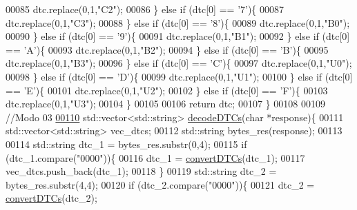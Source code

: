 \begin{DoxyCode}
00085         dtc.replace(0,1,\textcolor{stringliteral}{"C2"});
00086     \} \textcolor{keywordflow}{else} \textcolor{keywordflow}{if} (dtc[0] == \textcolor{charliteral}{'7'})\{
00087         dtc.replace(0,1,\textcolor{stringliteral}{"C3"});
00088     \} \textcolor{keywordflow}{else} \textcolor{keywordflow}{if} (dtc[0] == \textcolor{charliteral}{'8'})\{
00089         dtc.replace(0,1,\textcolor{stringliteral}{"B0"});
00090     \} \textcolor{keywordflow}{else} \textcolor{keywordflow}{if} (dtc[0] == \textcolor{charliteral}{'9'})\{
00091         dtc.replace(0,1,\textcolor{stringliteral}{"B1"});
00092     \} \textcolor{keywordflow}{else} \textcolor{keywordflow}{if} (dtc[0] == \textcolor{charliteral}{'A'})\{
00093         dtc.replace(0,1,\textcolor{stringliteral}{"B2"});
00094     \} \textcolor{keywordflow}{else} \textcolor{keywordflow}{if} (dtc[0] == \textcolor{charliteral}{'B'})\{
00095         dtc.replace(0,1,\textcolor{stringliteral}{"B3"});
00096     \} \textcolor{keywordflow}{else} \textcolor{keywordflow}{if} (dtc[0] == \textcolor{charliteral}{'C'})\{
00097         dtc.replace(0,1,\textcolor{stringliteral}{"U0"});
00098     \} \textcolor{keywordflow}{else} \textcolor{keywordflow}{if} (dtc[0] == \textcolor{charliteral}{'D'})\{
00099         dtc.replace(0,1,\textcolor{stringliteral}{"U1"});
00100     \} \textcolor{keywordflow}{else} \textcolor{keywordflow}{if} (dtc[0] == \textcolor{charliteral}{'E'})\{
00101         dtc.replace(0,1,\textcolor{stringliteral}{"U2"});
00102     \} \textcolor{keywordflow}{else} \textcolor{keywordflow}{if} (dtc[0] == \textcolor{charliteral}{'F'})\{
00103         dtc.replace(0,1,\textcolor{stringliteral}{"U3"});
00104     \}
00105 
00106     \textcolor{keywordflow}{return} dtc;
00107 \}
00108 
00109 \textcolor{comment}{//Modo 03}
\hyperlink{decoders_8hpp_aac9b3d4ea17ee4dbbdf755b0b510137a}{00110} std::vector<std::string> \hyperlink{decoders_8cpp_aac9b3d4ea17ee4dbbdf755b0b510137a}{decodeDTCs}(\textcolor{keywordtype}{char} *response)\{
00111     std::vector<std::string> vec\_dtcs;
00112     std::string bytes\_res(response);
00113 
00114     std::string dtc\_1 = bytes\_res.substr(0,4);
00115     \textcolor{keywordflow}{if} (dtc\_1.compare(\textcolor{stringliteral}{"0000"}))\{
00116         dtc\_1 = \hyperlink{decoders_8cpp_a4f18f411252f4c60fae4af320989c262}{convertDTCs}(dtc\_1);
00117         vec\_dtcs.push\_back(dtc\_1);
00118     \}
00119     std::string dtc\_2 = bytes\_res.substr(4,4);
00120     \textcolor{keywordflow}{if} (dtc\_2.compare(\textcolor{stringliteral}{"0000"}))\{
00121         dtc\_2 = \hyperlink{decoders_8cpp_a4f18f411252f4c60fae4af320989c262}{convertDTCs}(dtc\_2);

\end{DoxyCode}
